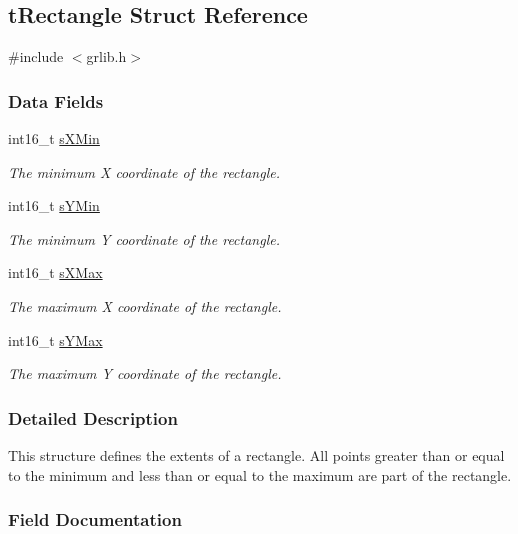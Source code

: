 \subsection{t\+Rectangle Struct Reference}
\label{structt_rectangle}


{\ttfamily \#include $<$grlib.\+h$>$}

\subsubsection*{Data Fields}
\begin{DoxyCompactItemize}
\item 
int16\+\_\+t \hyperlink{structt_rectangle_a873c21850bef092981d16bba615b6c98}{s\+X\+Min}
\begin{DoxyCompactList}\small\item\em The minimum X coordinate of the rectangle. \end{DoxyCompactList}\item 
int16\+\_\+t \hyperlink{structt_rectangle_a99f8d734c2a12f301bd2a9e8b9036a7a}{s\+Y\+Min}
\begin{DoxyCompactList}\small\item\em The minimum Y coordinate of the rectangle. \end{DoxyCompactList}\item 
int16\+\_\+t \hyperlink{structt_rectangle_a9edcf50a0eafaa7eed1ab371b4107a5a}{s\+X\+Max}
\begin{DoxyCompactList}\small\item\em The maximum X coordinate of the rectangle. \end{DoxyCompactList}\item 
int16\+\_\+t \hyperlink{structt_rectangle_aa9c0683f5c6dc0153b913354b5bba805}{s\+Y\+Max}
\begin{DoxyCompactList}\small\item\em The maximum Y coordinate of the rectangle. \end{DoxyCompactList}\end{DoxyCompactItemize}


\subsubsection{Detailed Description}
This structure defines the extents of a rectangle. All points greater than or equal to the minimum and less than or equal to the maximum are part of the rectangle. 

\subsubsection{Field Documentation}
